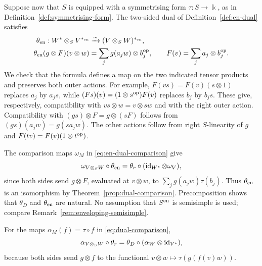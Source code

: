\begin{advanced}
Suppose now that $S$ is equipped with a symmetrising form $\tau:S\to\Bbbk$, as in Definition~\ref{def:symmetrising-form}.
The two-sided dual of Definition~\ref{def:en-dual} satisfies
\begin{equation}\label{eq:tensor-two-sided-dual}
\begin{aligned}
\theta_{\mathrm{en}}:W^*\otimes_S V^{*_{\mathrm{en}}}
&\xrightarrow{\sim}(V\otimes_S W)^{*_{\mathrm{en}}},\\
\theta_{\mathrm{en}}(g\otimes F)(v\otimes w)
&=\sum_j g(a_jw)\otimes b_j^{\mathrm{op}},
\qquad F(v)=\sum_j a_j\otimes b_j^{\mathrm{op}}.
\end{aligned}
\end{equation}
We check that the formula defines a map on the two indicated tensor products and preserves both outer actions.
For example, $F(vs)=F(v)(s\otimes1)$ replaces $a_j$ by $a_js$, while
$(Fs)(v)=(1\otimes s^{\mathrm{op}})F(v)$ replaces $b_j$ by $b_js$.
These give, respectively, compatibility with $vs\otimes w=v\otimes sw$ and with the right outer action.
Compatibility with $(gs)\otimes F=g\otimes(sF)$ follows from $(gs)(a_jw)=g(sa_jw)$.
The other actions follow from right $S$-linearity of $g$ and $F(tv)=F(v)(1\otimes t^{\mathrm{op}})$.

The comparison maps $\omega_M$ in \eqref{eq:en-dual-comparison} give
\[
\omega_{V\otimes_S W}\circ\theta_{\mathrm{en}}
=\theta_r\circ(\operatorname{id}_{W^*}\otimes\omega_V),
\]
since both sides send $g\otimes F$, evaluated at $v\otimes w$, to $\sum_j g(a_jw)\tau(b_j)$.
Thus $\theta_{\mathrm{en}}$ is an isomorphism by Theorem~\ref{prop:dual-comparison}.
Precomposition shows that $\theta_D$ and $\theta_{\mathrm{en}}$ are natural.
No assumption that $S^{\mathrm{en}}$ is semisimple is used; compare Remark~\ref{rem:enveloping-semisimple}.

For the maps $\alpha_M(f)=\tau\circ f$ in \eqref{eq:dual-comparison},
\[
\alpha_{V\otimes_S W}\circ\theta_r
=\theta_D\circ(\alpha_W\otimes\operatorname{id}_{V^*}),
\]
because both sides send $g\otimes f$ to the functional $v\otimes w\mapsto\tau(g(f(v)w))$.
\end{advanced}

